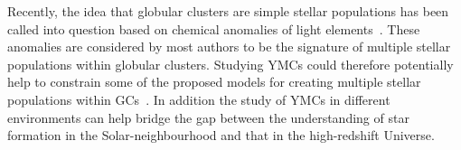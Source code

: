 \documentclass[useAMS,usenatbib]{mn2e}
\begin{document}


Recently, the idea that globular clusters are simple stellar populations has been called into question based on chemical anomalies of light elements~\citep[C, N, O, Na and Al; e.g.][]{2012A&ARv..20...50G}.
These anomalies are considered by most authors to be the signature of multiple stellar populations within globular clusters.
Studying YMCs could therefore potentially help to constrain some of the proposed models for creating multiple stellar populations within GCs~\citep[e.g.][]{2014MNRAS.441.2754C}.
In addition the study of YMCs in different environments can help bridge the gap between the understanding of star formation in the Solar-neighbourhood and that in the high-redshift Universe.


\end{document}
